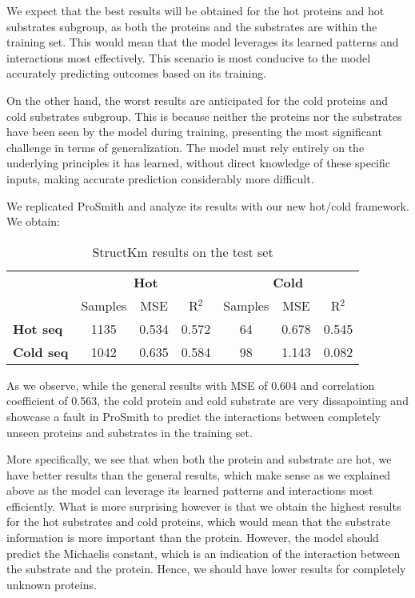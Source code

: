 We expect that the best results will be obtained for the hot proteins and hot substrates subgroup, 
as both the proteins and the substrates are within the training set. This would mean that 
the model leverages its learned patterns and interactions most effectively. 
This scenario is most conducive to the model accurately predicting outcomes based on its training.

On the other hand, the worst results are anticipated for the cold proteins and cold substrates subgroup. 
This is because neither the proteins nor the substrates have been seen by the model during training, 
presenting the most significant challenge in terms of generalization. The model must rely entirely 
on the underlying principles it has learned, without direct knowledge of these specific inputs, 
making accurate prediction considerably more difficult.

We replicated ProSmith and analyze its results with our new hot/cold framework. We obtain:

\begin{table}[ht]
  \centering
  \begin{tabular}{lcccccc}
  \hline
   & \multicolumn{3}{c}{\textbf{Hot}} & \multicolumn{3}{c}{\textbf{Cold}} \\
   & Samples & MSE & R\(^2\) & Samples & MSE & R\(^2\) \\ \hline
  \textbf{Hot seq}  & 1135 & 0.534 & 0.572 & 64 & 0.678 & 0.545 \\
  \textbf{Cold seq} & 1042 & 0.635 & 0.584 & 98 & 1.143 & 0.082 \\ \hline
  \end{tabular}
  \caption{StructKm results on the test set}
  \label{tab:prosmith_results}
\end{table}

As we observe, while the general results with MSE of 0.604 and correlation coefficient of 0.563, the
cold protein and cold substrate are very dissapointing and showcase a fault in ProSmith to predict the
interactions between completely unseen proteins and substrates in the training set.

More specifically, we see that when both the protein and substrate are hot, we have better results than
the general results, which make sense as we explained above as the model can leverage its learned patterns
and interactions most efficiently. What is more surprising however is that we obtain the highest results
for the hot substrates and cold proteins, which would mean that the substrate information is more
important than the protein. However, the model should predict the Michaelis constant, which is an
indication of the interaction between the substrate and the protein. Hence, we should have lower results
for completely unknown proteins. 

